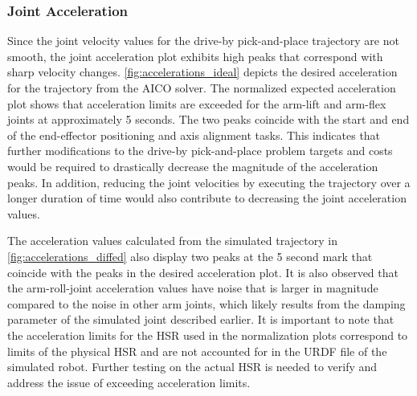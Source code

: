 \documentclass[12pt]{article}
\begin{document}
        \subsubsection{Joint Acceleration}
            Since the joint velocity values for the drive-by pick-and-place trajectory are not smooth, the joint acceleration plot exhibits high peaks that correspond with sharp velocity changes. \cref{fig:accelerations_ideal} depicts the desired acceleration for the trajectory from the AICO solver. The normalized expected acceleration plot shows that acceleration limits are exceeded for the arm-lift and arm-flex joints at approximately 5 seconds. The two peaks coincide with the start and end of the end-effector positioning and axis alignment tasks. This indicates that further modifications to the drive-by pick-and-place problem targets and costs would be required to drastically decrease the magnitude of the acceleration peaks. In addition, reducing the joint velocities by executing the trajectory over a longer duration of time would also contribute to decreasing the joint acceleration values.
            \par The acceleration values calculated from the simulated trajectory in \cref{fig:accelerations_diffed} also display two peaks at the 5 second mark that coincide with the peaks in the desired acceleration plot. It is also observed that the arm-roll-joint acceleration values have noise that is larger in magnitude compared to the noise in other arm joints, which likely results from the damping parameter of the simulated joint described earlier. It is important to note that the acceleration limits for the HSR used in the normalization plots correspond to limits of the physical HSR and are not accounted for in the URDF file of the simulated robot. Further testing on the actual HSR is needed to verify and address the issue of exceeding acceleration limits.
\end{document}
